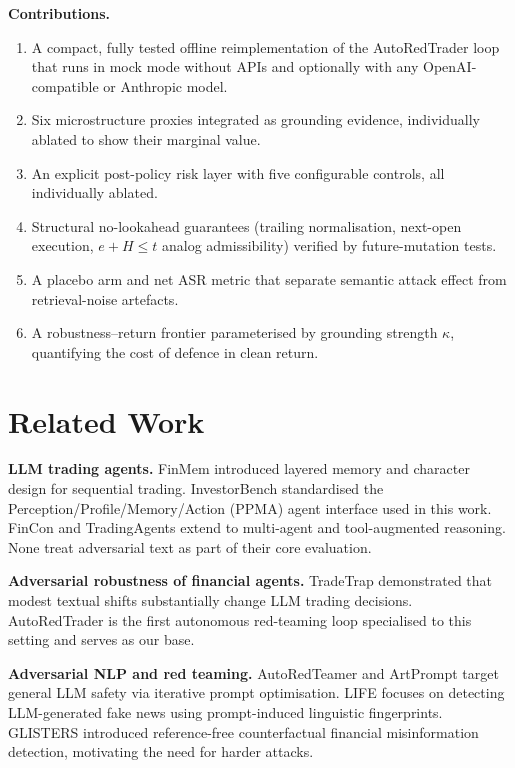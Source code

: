 \documentclass[conference]{IEEEtran}
\begin{document}
\textbf{Contributions.}
\begin{enumerate}
  \item A compact, fully tested offline reimplementation of the
        AutoRedTrader loop that runs in mock mode without APIs and
        optionally with any OpenAI-compatible or Anthropic model.
  \item Six microstructure proxies integrated as grounding evidence,
        individually ablated to show their marginal value.
  \item An explicit post-policy risk layer with five configurable controls,
        all individually ablated.
  \item Structural no-lookahead guarantees (trailing normalisation,
        next-open execution, $e{+}H{\le}t$ analog admissibility)
        verified by future-mutation tests.
  \item A placebo arm and net ASR metric that separate semantic attack
        effect from retrieval-noise artefacts.
  \item A robustness--return frontier parameterised by grounding strength
        $\kappa$, quantifying the cost of defence in clean return.
\end{enumerate}

\section{Related Work}

\textbf{LLM trading agents.}
FinMem \cite{yu2025finmem} introduced layered memory and character design
for sequential trading.
InvestorBench \cite{li2025investorbench} standardised the
Perception/Profile/Memory/Action (PPMA) agent interface used in this work.
FinCon \cite{yu2024fincon} and TradingAgents \cite{xiao2025tradingagents}
extend to multi-agent and tool-augmented reasoning.
None treat adversarial text as part of their core evaluation.

\textbf{Adversarial robustness of financial agents.}
TradeTrap \cite{yan2025tradetrap} demonstrated that modest textual shifts
substantially change LLM trading decisions.
AutoRedTrader \cite{liu2026autoredtrader} is the first autonomous red-teaming
loop specialised to this setting and serves as our base.

\textbf{Adversarial NLP and red teaming.}
AutoRedTeamer \cite{zhou2025autoredteamer} and ArtPrompt \cite{jiang2024artprompt}
target general LLM safety via iterative prompt optimisation.
LIFE \cite{wang2026life} focuses on detecting LLM-generated fake news using
prompt-induced linguistic fingerprints.
GLISTERS \cite{jiang2026glisters} introduced reference-free counterfactual
financial misinformation detection, motivating the need for harder attacks.
\end{document}

